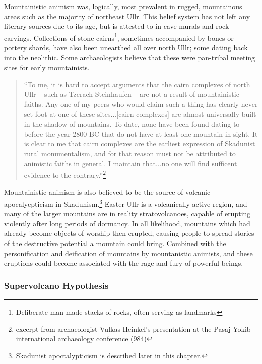 Mountainistic animism was, logically, most prevalent in rugged, mountainous areas such as the majority of northeast Ullr. This belief system has not left any literary sources due to its age, but is attested to in cave murals and rock carvings. Collections of stone cairns\footnote{Deliberate man-made stacks of rocks, often serving as landmarks}, sometimes accompanied by bones or pottery shards, have also been unearthed all over north Ullr; some dating back into the neolithic. Some archaeologists believe that these were pan-tribal meeting sites for early mountainists. \par
\begin{quote}
``To me, it is hard to accept arguments that the cairn complexes of north Ullr -- such as Tzerach Steinhaufen -- are not a result of mountainistic faiths. Any one of my peers who would claim such a thing has clearly never set foot at one of these sites...[cairn complexes] are almost universally built in the shadow of mountains. To date, none have been found dating to before the year 2800 BC that do not have at least one mountain in sight. It is clear to me that cairn complexes are the earliest expression of Skadunist rural monumentalism, and for that reason must not be attributed to animistic faiths in general. I maintain that...no one will find sufficent evidence to the contrary.''\footnote{excerpt from archaeologist Vulkas Heinkel's presentation at the Pasaj Yokib international archaeology conference (984)}
\end{quote}

Mountainistic animism is also believed to be the source of volcanic apocalycpticism in Skadunism.\footnote{Skadunist apoctalypticism is described later in this chapter.} Easter Ullr is a volcanically active region, and many of the larger mountains are in reality stratovolcanoes, capable of erupting violently after long periods of dormancy. In all likelihood, mountains which had already become objects of worship then erupted, causing people to spread stories of the  destructive potential a mountain could bring. Combined with the personification and deification of mountains by mountanistic animists, and these eruptions could become associated with the rage and fury of powerful beings.

\subsubsection{Supervolcano Hypothesis}

